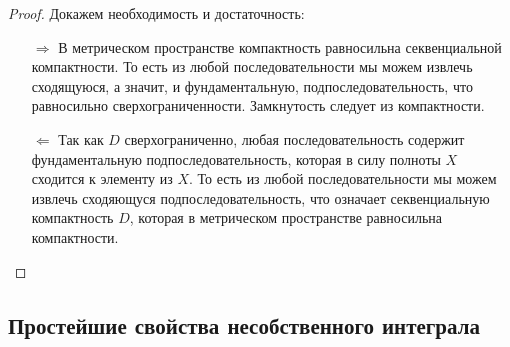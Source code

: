 \begin{proof}
	Докажем необходимость и достаточность:
	\begin{enumerate}
		\item[\(\Rightarrow\)] В метрическом пространстве компактность равносильна секвенциальной компактности. То есть из любой последовательности мы можем извлечь сходящуюся, а значит, и фундаментальную, подпоследовательность, что равносильно сверхограниченности. Замкнутость следует из компактности.
		\item[\(\Leftarrow\)] Так как \(D\) сверхограниченно, любая последовательность содержит фундаментальную подпоследовательность, которая в силу полноты \(X\) сходится к элементу из \(X\). То есть из любой последовательности мы можем извлечь сходяющуся подпоследовательность, что означает секвенциальную компактность \(D\), которая в метрическом пространстве равносильна компактности.
	\end{enumerate}
\end{proof}

\subsection{Простейшие свойства несобственного интеграла}

